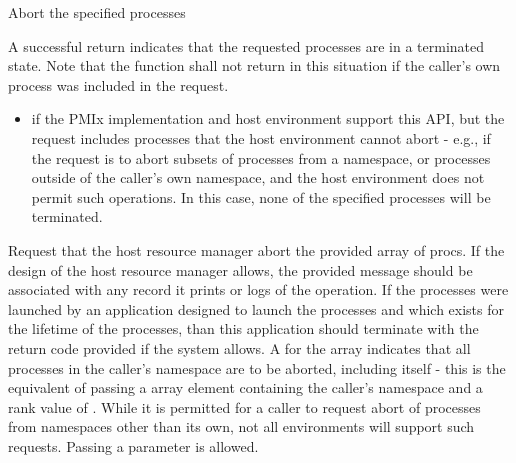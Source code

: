 \summary

Abort the specified processes

\format


\begin{arglist}
\end{arglist}

A successful return indicates that the requested processes are in a terminated state.  Note that the function shall not return in this situation if the caller's own process was included in the request.

\returnstart
\begin{itemize}
    \item {} if the \ac{PMIx} implementation and host environment support this \ac{API}, but the request includes processes that the host environment cannot abort - e.g., if the request is to abort subsets of processes from a namespace, or processes outside of the caller's own namespace, and the host environment does not permit such operations. In this case, none of the specified processes will be terminated.
\end{itemize}
\returnend

\descr
Request that the host resource manager abort the provided array of procs.   If the design of the host resource manager allows, the provided message should be associated with any record it prints or logs of the operation.
If the processes were launched by an application designed to launch the processes and which exists for the lifetime of the processes, than this application should terminate with the return code provided if the system allows.
A  for the  array indicates that all processes in the caller's namespace are to be aborted, including itself - this is the equivalent of passing a  array element containing the caller's namespace and a rank value of . While it is permitted for a caller to request abort of processes from namespaces other than its own, not all environments will support such requests.
Passing a   parameter is allowed.

